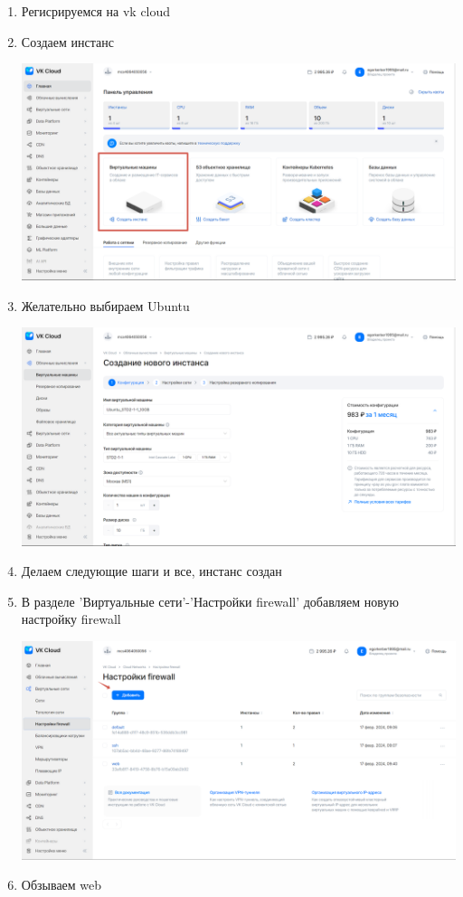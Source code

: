 \documentclass[14pt, a4paper]{extarticle}
\begin{document}
\begin{enumerate}
    \item Регисрируемся на vk cloud 
    \item Создаем инстанс 
    
    \includegraphics*[width=0.8\linewidth]{img/2024-02-17-17-41-09.png}

    \item Желательно выбираем Ubuntu
    
    \includegraphics*[width=0.8\linewidth]{img/2024-02-17-17-42-14.png}

    \item Делаем следующие шаги и все, инстанс создан 
    \item В разделе 'Виртуальные сети'-'Настройки firewall' добавляем новую настройку firewall 

    \includegraphics*[width=0.8\linewidth]{img/2024-02-17-17-57-58.png}    
    
    \item Обзываем web 


\end{enumerate}
\end{document}
